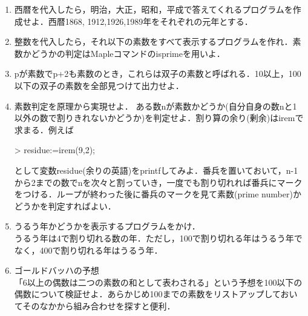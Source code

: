 \begin{enumerate}
\item 西暦を代入したら，明治，大正，昭和，平成で答えてくれるプログラムを作成せよ．西暦1868, 1912,1926,1989年をそれぞれの元年とする．
\item 整数を代入したら，それ以下の素数をすべて表示するプログラムを作れ．素数かどうかの判定はMapleコマンドのisprimeを用いよ．
\item pが素数でp+2も素数のとき，これらは双子の素数と呼ばれる．10以上，100以下の双子の素数を全部見つけて出力せよ．
\item 素数判定を原理から実現せよ．
ある数nが素数かどうか(自分自身の数nと1以外の数で割りきれないかどうか)を判定せよ．割り算の余り(剰余)はiremで求まる．例えば
\begin{MapleInput}
> residue:=irem(9,2);
\end{MapleInput}
として変数residue(余りの英語)をprintfしてみよ．番兵を置いておいて，n-1から2までの数でnを次々と割っていき，一度でも割り切れれば番兵にマークをつける．ループが終わった後に番兵のマークを見て素数(prime number)かどうかを判定すればよい．
\item うるう年かどうかを表示するプログラムをかけ．\\
うるう年は4で割り切れる数の年．ただし，100で割り切れる年はうるう年でなく，400で割り切れる年はうるう年．
\item ゴールドバッハの予想 \\
「6以上の偶数は二つの素数の和として表わされる」という予想を100以下の偶数について検証せよ．あらかじめ100までの素数をリストアップしておいてそのなかから組み合わせを探すと便利．
\end{enumerate}
